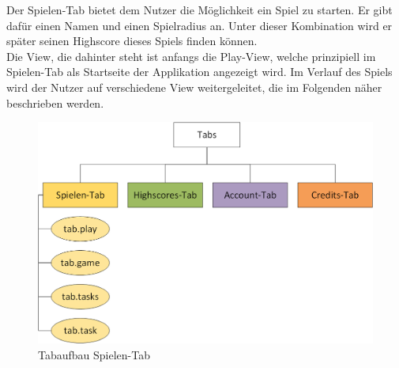 Der Spielen-Tab bietet dem Nutzer die Möglichkeit ein Spiel zu starten. Er gibt dafür einen Namen und einen Spielradius an. Unter dieser Kombination wird er später seinen Highscore dieses Spiels finden können. 
\\
Die View, die dahinter steht ist anfangs die Play-View, welche prinzipiell im Spielen-Tab als Startseite der Applikation angezeigt wird. Im Verlauf des Spiels wird der Nutzer auf verschiedene View weitergeleitet, die im Folgenden näher beschrieben werden. 
\begin{figure}[h]
\centering
\includegraphics[width=1\textwidth]{ref/images/tabs_spielen.png}
\caption[Tabaufbau Spielen-Tab]{Tabaufbau Spielen-Tab}
\label{fig:Tabaufbau Spielen-Tab}
\end{figure}

\newpage
